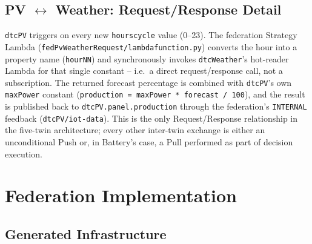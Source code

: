 \documentclass[11pt]{article}
\renewcommand{\_}{\textunderscore\allowbreak}
\begin{document}
\subsection{PV $\leftrightarrow$ Weather: Request/Response Detail}

\texttt{dtcPV} triggers on every new \texttt{hours\_cycle} value (0--23).
The federation Strategy Lambda
(\texttt{fedPvWeatherRequest/lambda\_function.py}) converts the hour into a
property name (\texttt{hourNN}) and synchronously invokes
\texttt{dtcWeather}'s hot-reader Lambda for that single constant --
i.e.\ a direct request/response call, not a subscription. The returned
forecast percentage is combined with \texttt{dtcPV}'s own \texttt{maxPower}
constant (\texttt{production = maxPower * forecast / 100}), and the result is
published back to \texttt{dtcPV.panel.production} through the federation's
\texttt{INTERNAL} feedback (\texttt{dtcPV/iot-data}). This is the only
Request/Response relationship in the five-twin architecture; every other
inter-twin exchange is either an unconditional Push or, in Battery's case, a
Pull performed as part of decision execution.

\section{Federation Implementation}
\label{sec:impl}

\subsection{Generated Infrastructure}
\end{document}
